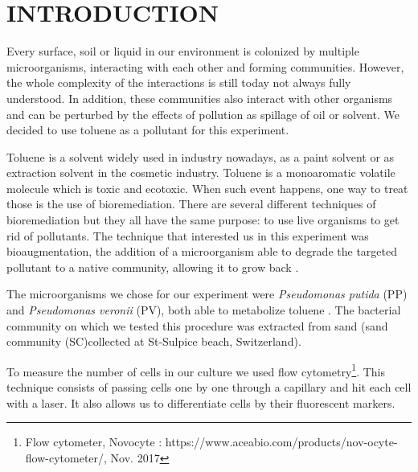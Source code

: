 \documentclass[a4paper, 10pt, conference]{ieeeconf}   %
\begin{document}
\section{INTRODUCTION}


Every surface, soil or liquid in our environment is colonized by multiple microorganisms, interacting with each other and forming communities. However, the whole complexity of the interactions is still today not always fully understood.
In addition, these communities also interact with other organisms and can be perturbed by the effects of pollution as spillage of oil or solvent. We decided to use toluene as a pollutant for this experiment.

Toluene is a solvent widely used in industry nowadays, as a paint solvent or as extraction solvent in the cosmetic industry. Toluene is a monoaromatic volatile molecule which is toxic and ecotoxic\cite{toluene}. 
When such event happens, one way to treat those is the use of bioremediation. There are several different techniques of bioremediation but they all have the same purpose: to use live organisms to get rid of pollutants. The technique that interested us in this experiment was bioaugmentation, the addition of a microorganism able to degrade the targeted pollutant to a native community, allowing it to grow back \cite{Bioremediation}.

The microorganisms we chose for our experiment were \textit{Pseudomonas putida} (PP) and \textit{Pseudomonas veronii} (PV), both able to metabolize toluene \cite{pseudomonas_putida} \cite{Pseudomonas_Veronii}. The bacterial community on which we tested this procedure was extracted from sand (sand community (SC)collected at St-Sulpice beach, Switzerland).

To measure the number of cells in our culture we used flow cytometry\footnote{Flow cytometer, Novocyte : https://www.aceabio.com/products/nov-ocyte-flow-cytometer/, Nov. 2017}. This technique consists of passing cells one by one through a capillary and hit each cell with a laser. It also allows us to differentiate cells by their fluorescent markers.
\end{document}

